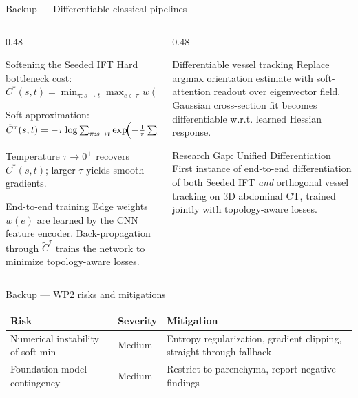\documentclass[aspectratio=169,11pt,xcolor=table]{beamer}
\begin{document}
\begin{frame}{Backup --- Differentiable classical pipelines}
\footnotesize
\begin{columns}[T]
\begin{column}{0.48\linewidth}
\begin{block}{Softening the Seeded IFT}
\scriptsize
Hard bottleneck cost: $C^*(s,t) = \min_{\pi: s\to t} \max_{e\in\pi} w(e)$

Soft approximation: $\tilde{C}^\tau(s,t) = -\tau \log \sum_{\pi: s\to t} \exp\!\Bigl(-\tfrac{1}{\tau}\textstyle\sum_{e\in\pi} w(e)\Bigr)$

Temperature $\tau \to 0^+$ recovers $C^*(s,t)$; larger $\tau$ yields smooth gradients.
\end{block}
\vspace{0.1cm}
\begin{block}{End-to-end training}
\scriptsize
Edge weights $w(e)$ are learned by the CNN feature encoder. Back-propagation through $\tilde{C}^\tau$ trains the network to minimize topology-aware losses.
\end{block}
\end{column}
\begin{column}{0.48\linewidth}
\begin{block}{Differentiable vessel tracking}
\scriptsize
Replace argmax orientation estimate with soft-attention readout over eigenvector field. Gaussian cross-section fit becomes differentiable w.r.t. learned Hessian response.
\end{block}
\vspace{0.15cm}
\begin{alertblock}{Research Gap: Unified Differentiation}
\scriptsize
First instance of end-to-end differentiation of both Seeded IFT \emph{and} orthogonal vessel tracking on 3D abdominal CT, trained jointly with topology-aware losses.
\end{alertblock}
\end{column}
\end{columns}
\end{frame}

\begin{frame}{Backup --- WP2 risks and mitigations}
\footnotesize
\vspace{0.1cm}
\begin{center}
\begin{tabular}{p{3.2cm}p{1.8cm}p{5.5cm}}
\toprule
\textbf{Risk} & \textbf{Severity} & \textbf{Mitigation} \\
\midrule
Numerical instability of soft-min & \textcolor{accent}{Medium} & Entropy regularization, gradient clipping, straight-through fallback \\
\rowcolor{accentlight}
Foundation-model contingency & \textcolor{accent}{Medium} & Restrict to parenchyma, report negative findings \\
\bottomrule
\end{tabular}
\end{center}
\end{frame}
\end{document}
